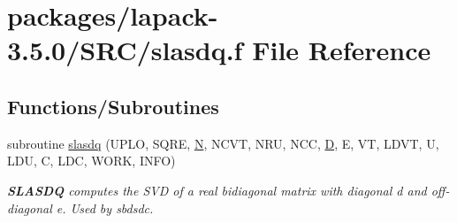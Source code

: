\hypertarget{slasdq_8f}{}\section{packages/lapack-\/3.5.0/\+S\+R\+C/slasdq.f File Reference}
\label{slasdq_8f}
\subsection*{Functions/\+Subroutines}
\begin{DoxyCompactItemize}
\item 
subroutine \hyperlink{group__auxOTHERauxiliary_gabb4a455a53f317631c56b07d4828eb28}{slasdq} (U\+P\+L\+O, S\+Q\+R\+E, \hyperlink{polmisc_8c_a0240ac851181b84ac374872dc5434ee4}{N}, N\+C\+V\+T, N\+R\+U, N\+C\+C, \hyperlink{odrpack_8h_a7dae6ea403d00f3687f24a874e67d139}{D}, E, V\+T, L\+D\+V\+T, U, L\+D\+U, C, L\+D\+C, W\+O\+R\+K, I\+N\+F\+O)
\begin{DoxyCompactList}\small\item\em {\bfseries S\+L\+A\+S\+D\+Q} computes the S\+V\+D of a real bidiagonal matrix with diagonal d and off-\/diagonal e. Used by sbdsdc. \end{DoxyCompactList}\end{DoxyCompactItemize}
